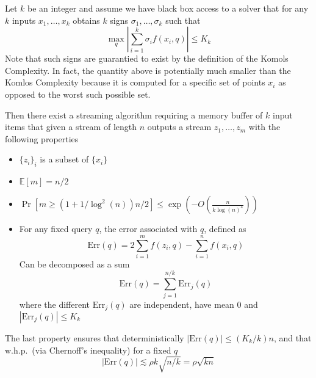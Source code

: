 \documentclass[anon,12pt]{colt2019} %
\newcommand{\E}{\mathbb{E}}
\renewcommand{\Pr}{\operatorname{Pr}}
\begin{document}
\begin{lemma} \label{lem:compactor}
Let $k$ be an integer and assume we have black box access to a solver that for any $k$ inputs $x_1,\ldots,x_k$ obtains $k$ signs $\sigma_1,\ldots,\sigma_k$ such that
$$\max_q \left| \sum_{i=1}^{k} \sigma_i f(x_i, q)\right| \leq K_k$$
Note that such signs are guarantied to exist by the definition of the Komols Complexity. 
In fact, the quantity above is potentially much smaller than the Komlos Complexity because it is computed for a specific set of points $x_i$ as opposed to the worst such possible set.


Then there exist a streaming algorithm requiring a memory buffer of $k$ input items that given a stream of length $n$ outputs a stream $z_1,\ldots,z_m$ with the following properties
\begin{itemize}
\item $\{z_i\}_i$ is a subset of $\{x_i\}$
\item $\E[m] = n/2$
\item $\Pr[m \geq (1+1/\log^2(n))n/2] \leq \exp \left( -O\left(\frac{n}{k\log(n)^4}\right)\right)$
\item For any fixed query $q$, the error associated with $q$, defined as
$$\text{Err}(q) = 2\sum_{i=1}^m f(z_i,q) - \sum_{i=1}^n f(x_i,q)  $$
Can be decomposed as a sum
$$\text{Err}(q) = \sum_{j=1}^{n/k} \text{Err}_j(q)$$
where the different $\text{Err}_j(q)$ are independent, have mean 0 and $|\text{Err}_j(q)| \leq K_k$
\end{itemize}
The last property ensures that deterministically $|\text{Err}(q)| \leq (K_k/k) n$, and that w.h.p.\ (via Chernoff's inequality) for a fixed $q$ 
$$|\text{Err}(q)| \lesssim \rho k\sqrt{n/k} = \rho \sqrt{kn}$$
\end{lemma}
\end{document}
